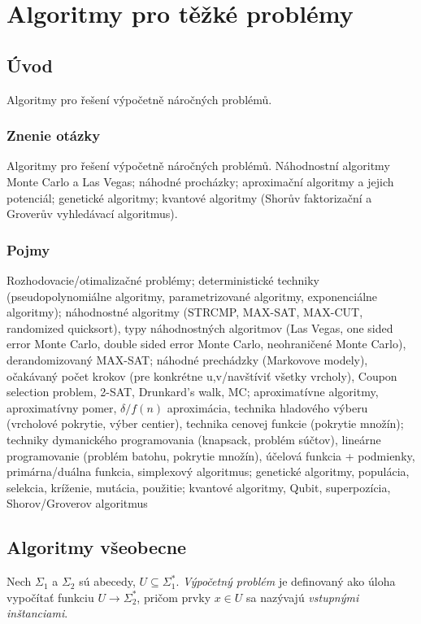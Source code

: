 \section{Algoritmy pro těžké problémy}

\subsection{Úvod}
Algoritmy pro řešení výpočetně náročných problémů.

\subsubsection*{Znenie otázky}
Algoritmy pro řešení výpočetně náročných problémů. Náhodnostní 
algoritmy Monte Carlo a Las Vegas; náhodné procházky; aproximační 
algoritmy a jejich potenciál; genetické algoritmy; 
kvantové algoritmy (Shorův faktorizační a Groverův vyhledávací algoritmus).

\subsubsection*{Pojmy}
Rozhodovacie/otimalizačné problémy; deterministické techniky (pseudopolynomiálne
algoritmy, parametrizované algoritmy, exponenciálne algoritmy); 
náhodnostné algoritmy (STRCMP, MAX-SAT, MAX-CUT, randomized quicksort),
typy náhodnostných algoritmov (Las Vegas, one sided error Monte Carlo, 
double sided error Monte Carlo, neohraničené Monte Carlo), derandomizovaný 
MAX-SAT; náhodné prechádzky (Markovove modely), očakávaný počet krokov 
(pre konkrétne u,v/navštíviť všetky vrcholy), Coupon selection problem, 2-SAT,
Drunkard's walk, MC; aproximatívne algoritmy, aproximatívny pomer, 
$\delta/f(n)$ aproximácia, technika hladového výberu (vrcholové pokrytie,
výber centier), technika cenovej funkcie (pokrytie množín);
techniky dymanického programovania (knapsack, problém súčtov), lineárne programovanie
(problém batohu, pokrytie množín), účelová funkcia + podmienky, primárna/duálna
funkcia, simplexový algoritmus; genetické algoritmy, populácia, selekcia, kríženie,
mutácia, použitie; kvantové algoritmy, Qubit, superpozícia, Shorov/Groverov algoritmus

\subsection{Algoritmy všeobecne}
Nech $\Sigma_1$ a $\Sigma_2$ sú abecedy, $U \subseteq \Sigma_1^*$.
{\em Výpočetný problém} je definovaný ako úloha vypočítať
funkciu $U \to \Sigma_2^*$, pričom prvky $x \in U$ sa nazývajú 
{\em vstupnými inštanciami}. 

